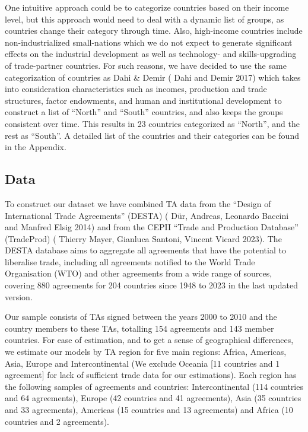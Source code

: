 \documentclass[12pt]{article}%
\begin{document}
One intuitive approach could be to categorize countries based on their
income level, but this approach would need to deal with a dynamic list
of groups, as countries change their category through time. Also,
high-income countries include non-industrialized small-nations which we
do not expect to generate significant effects on the industrial
development as well as technology- and skills-upgrading of trade-partner
countries. For such reasons, we have decided to use the same
categorization of countries as Dahi \& Demir (\cite{dahi_south-south_2017} Dahi and Demir 2017) which
takes into consideration characteristics such as incomes, production and
trade structures, factor endowments, and human and institutional
development to construct a list of ``North'' and ``South'' countries,
and also keeps the groups consistent over time. This results in 23
countries categorized as ``North'', and the rest as ``South''. A
detailed list of the countries and their categories can be found in the
Appendix.%
\subsection{Data}%
\label{subsec:Data}%

%
To construct our dataset we have combined TA data from the ``Design of
International Trade Agreements'' (DESTA) (\cite{dur_andreas_leonardo_baccini_and_manfred_elsig_design_2014} Dür, Andreas, Leonardo Baccini
and Manfred Elsig 2014) and from the CEPII ``Trade and Production
Database'' (TradeProd) (\cite{thierry_mayer_gianluca_santoni_vincent_vicard_cepii_2023} Thierry Mayer, Gianluca Santoni, Vincent Vicard
2023). The DESTA database aims to aggregate all agreements that have the
potential to liberalise trade, including all agreements notified to the
World Trade Organisation (WTO) and other agreements from a wide range of
sources, covering 880 agreements for 204 countries since 1948 to 2023 in
the last updated version.

Our sample consists of TAs signed between the years 2000 to 2010 and the
country members to these TAs, totalling 154 agreements and 143 member
countries. For ease of estimation, and to get a sense of geographical
differences, we estimate our models by TA region for five main regions:
Africa, Americas, Asia, Europe and Intercontinental (We exclude Oceania
{[}11 countries and 1 agreement{]} for lack of sufficient trade data for
our estimations). Each region has the following samples of agreements
and countries: Intercontinental (114 countries and 64 agreements),
Europe (42 countries and 41 agreements), Asia (35 countries and 33
agreements), Americas (15 countries and 13 agreements) and Africa (10
countries and 2 agreements).
\end{document}
